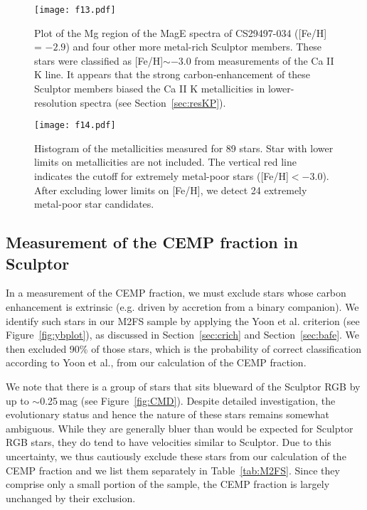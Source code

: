 \documentclass{emulateapj-rtx4}
\begin{document}
\begin{figure}[!htbp]
\centering
\texttt{[image: f13.pdf]}
\caption{Plot of the Mg region of the MagE spectra of CS29497-034 ([Fe/H] = $-2.9$) and four other more metal-rich Sculptor members. 
These stars were classified as [Fe/H]$\sim -3.0$ from measurements of the Ca II K line. 
It appears that the strong carbon-enhancement of these Sculptor members biased the Ca II K metallicities in lower-resolution spectra (see Section~\ref{sec:resKP}).}
\label{fig:mgregion}
\end{figure}


\begin{figure}[!t]
\centering
\texttt{[image: f14.pdf]}
\caption{Histogram of the metallicities measured for 89 stars. Star with lower limits on metallicities are not included. The vertical red line indicates the cutoff for
extremely metal-poor stars ([Fe/H]$ < -3.0$). After excluding lower limits on [Fe/H], we detect 24 extremely metal-poor star candidates.}
\label{fig:fehhist}
\end{figure}


\subsection{Measurement of the CEMP fraction in Sculptor}
\label{sec:measurement}

In a measurement of the CEMP fraction, we must exclude stars whose carbon enhancement is extrinsic (e.g. driven by accretion from a binary companion). 
We identify such stars in our M2FS sample by applying the Yoon et al. criterion (see Figure~\ref{fig:ybplot}), as discussed in Section~\ref{sec:crich} and Section~\ref{sec:bafe}. 
We then excluded 90\% of those stars, which is the probability of correct classification according to Yoon et al., from our calculation of the CEMP fraction. 

We note that there is a group of stars that sits blueward of the Sculptor RGB by up to $\sim$0.25\,mag (see Figure~\ref{fig:CMD}). 
Despite detailed investigation, the evolutionary status and hence the nature of these stars remains somewhat ambiguous. 
While they are generally bluer than would be expected for Sculptor RGB stars, they do tend to have velocities similar to Sculptor.
Due to this uncertainty, we thus cautiously exclude these stars from our calculation of the CEMP fraction and we list them separately in Table~\ref{tab:M2FS}. 
Since they comprise only a small portion of the sample, the CEMP fraction is largely unchanged by their exclusion.  
\end{document}
